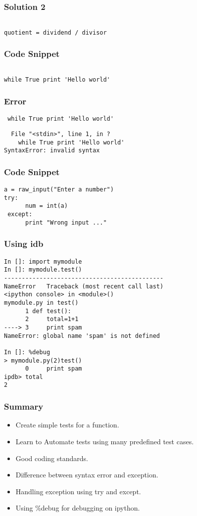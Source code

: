 \documentclass[presentation]{beamer}
\begin{document}
\begin{frame}[fragile]
\frametitle{Solution 2}
\label{sec-10}

\begin{verbatim}

quotient = dividend / divisor
\end{verbatim}
\end{frame}
\begin{frame}[fragile]
\frametitle{Code Snippet}
\label{sec-11}

\begin{verbatim}

while True print 'Hello world'
\end{verbatim}
\end{frame}
\begin{frame}[fragile]
\frametitle{Error}
\label{sec-12}

\begin{lstlisting}
 while True print 'Hello world'
 \end{lstlisting}
  \begin{lstlisting}
  File "<stdin>", line 1, in ?
    while True print 'Hello world'
SyntaxError: invalid syntax
\end{lstlisting}
\end{frame}
\begin{frame}[fragile]
\frametitle{Code Snippet}
\label{sec-13}

\begin{verbatim}
a = raw_input("Enter a number")
try:
      num = int(a)
 except:
      print "Wrong input ..."
\end{verbatim}
\end{frame}
\begin{frame}[fragile]
\frametitle{Using idb}
\label{sec-14}

\small
\begin{lstlisting}
In []: import mymodule
In []: mymodule.test()
---------------------------------------------
NameError   Traceback (most recent call last)
<ipython console> in <module>()
mymodule.py in test()
      1 def test():
      2     total=1+1
----> 3     print spam
NameError: global name 'spam' is not defined

In []: %debug
> mymodule.py(2)test()
      0     print spam
ipdb> total
2
\end{lstlisting}
\end{frame}
\begin{frame}
\frametitle{Summary}
\label{sec-15}

\begin{itemize}
\item Create simple tests for a function.
\item Learn to Automate tests using many predefined test cases.
\item Good coding standards.
\item Difference between syntax error and exception.
\item Handling exception using try and except.
\item Using \%debug for debugging on ipython.
\end{itemize}
\end{frame}
\end{document}

